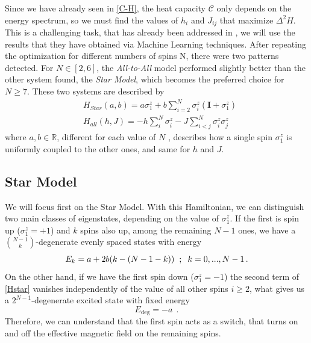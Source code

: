 Since we have already seen in \ref{C-H}, the heat capacity $\mathcal{C}$ only depends on the energy spectrum, so we must find the values of $h_i$ and $J_{ij}$ that maximize $\Delta^2 H$. This is a challenging task, that has already been addressed in \cite{abiuso2022optimal}, we will use the results that they have obtained via Machine Learning techniques. After repeating the optimization for different numbers of spins N, there were two patterns detected. For $N \in [2,6]$, the \textit{All-to-All} model performed slightly better than the other system found, the \textit{Star Model}, which becomes the preferred choice for $N \geq 7$. These two systems are described by
\begin{align}
    &H_{Star}(a,b)=a\sigma_1^z + b\sum_{i=2}^{N}\sigma_i^z(\mathbf{I}+\sigma_1^z)
    \label{Hstar}\\
    &H_{all}(h,J)=-h\sum_i^N\sigma_i^z-J\sum_{i<j}^N\sigma_i^z \sigma_j^z
    \label{H_all}
\end{align}
where $a,b\in\mathbb{R}$, different for each value of $N$ \cite{abiuso2022optimal}, describes how a single spin $\sigma_1^z$ is uniformly coupled to the other ones, and same for $h$ and $J$.
\subsection{Star Model}
We will focus first on the Star Model. With this Hamiltonian, we can distinguish two main classes of eigenstates, depending on the value of $\sigma_1^z$. If the first is spin up  ($\sigma_1^z=+1$) and $k$ spins also up, among the remaining $N-1$ ones, we have a $\binom{N-1}{k}$-degenerate evenly spaced states with energy
\begin{equation}\label{E_k_star}
    E_k=a+2b(k-(N-1-k))\hspace{0.2cm};\hspace{0.2cm}k=0,...,N-1 \,.
\end{equation}
On the other hand, if we have the first spin down ($\sigma_1^z=-1$) the second term of \eqref{Hstar} vanishes independently of the value of all other spins $i\geq2$, what gives us a $2^{N-1}$-degenerate excited state with fixed energy
\begin{equation}
    E_{\text{deg}}=-a \ \  .
\end{equation}
Therefore, we can understand that the first spin acts as a switch, that turns on and off the effective magnetic field on the remaining spins.

